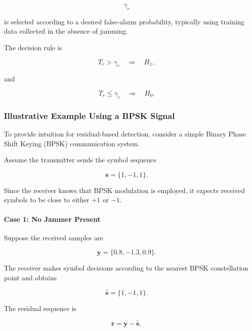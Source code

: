 \documentclass{article}
\begin{document}
\begin{equation}
\gamma_r
\end{equation}

is selected according to a desired false-alarm probability, typically using training data collected in the absence of jamming.

The decision rule is

\begin{equation}
T_r > \gamma_r
\quad \Rightarrow \quad H_1,
\end{equation}

and

\begin{equation}
T_r \le \gamma_r
\quad \Rightarrow \quad H_0.
\end{equation}
\subsubsection{Illustrative Example Using a BPSK Signal}

To provide intuition for residual-based detection, consider a simple Binary Phase Shift Keying (BPSK) communication system.

Assume the transmitter sends the symbol sequence

\begin{equation}
\mathbf{s}
=
\{1,-1,1\}.
\end{equation}

Since the receiver knows that BPSK modulation is employed, it expects received symbols to be close to either $+1$ or $-1$.

\paragraph{Case 1: No Jammer Present}

Suppose the received samples are

\begin{equation}
\mathbf{y}
=
\{0.8,-1.3,0.9\}.
\end{equation}

The receiver makes symbol decisions according to the nearest BPSK constellation point and obtains

\begin{equation}
\hat{\mathbf{s}}
=
\{1,-1,1\}.
\end{equation}

The residual sequence is

\begin{equation}
\mathbf{r}
=
\mathbf{y}
-
\hat{\mathbf{s}},
\end{equation}
\end{document}
